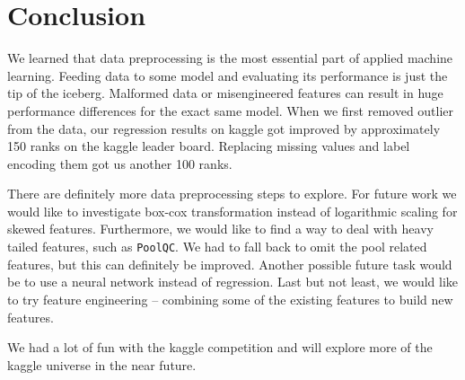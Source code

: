 \section{Conclusion}

We learned that data preprocessing is the most essential part of applied machine learning. Feeding data to some model and evaluating its performance is just the tip of the iceberg. Malformed data or misengineered features can result in huge performance differences for the exact same model. When we first removed outlier from the data, our regression results on kaggle got improved by approximately 150 ranks on the kaggle leader board. Replacing missing values and label encoding them got us another 100 ranks.

There are definitely more data preprocessing steps to explore. For future work we would like to investigate box-cox transformation instead of logarithmic scaling for skewed features. Furthermore, we would like to find a way to deal with heavy tailed features, such as \texttt{PoolQC}. We had to fall back to omit the pool related features, but this can definitely be improved. Another possible future task would be to use a neural network instead of regression. Last but not least, we would like to try feature engineering -- combining some of the existing features to build new features.

We had a lot of fun with the kaggle competition and will explore more of the kaggle universe in the near future.